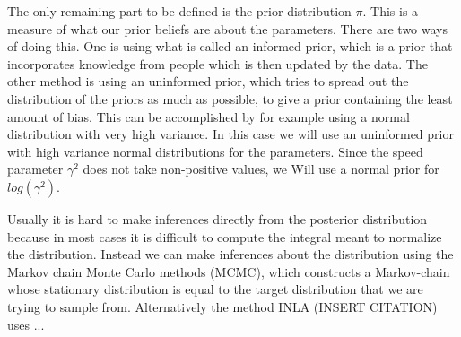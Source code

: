 The only remaining part to be defined is the prior distribution $\pi$. This is a measure of what our prior beliefs are about the parameters. There are two ways of doing this. One is using what is called an informed prior, which is a prior that incorporates knowledge from people which is then updated by the data. The other method is using an uninformed prior, which tries to spread out the distribution of the priors as much as possible, to give a prior containing the least amount of bias. This can be accomplished by for example using a normal distribution with very high variance. In this case we will use an uninformed prior with high variance normal distributions for the parameters. Since the speed parameter $\gamma^2$ does not take non-positive values, we Will use a normal prior for $log(\gamma^2)$.

Usually it is hard to make inferences directly from the posterior distribution because in most cases it is difficult to compute the integral meant to normalize the distribution. Instead we can make inferences about the distribution using the Markov chain Monte Carlo methods (MCMC), which constructs a Markov-chain whose stationary distribution is equal to the target distribution that we are trying to sample from. Alternatively the method INLA (INSERT CITATION) uses ...

